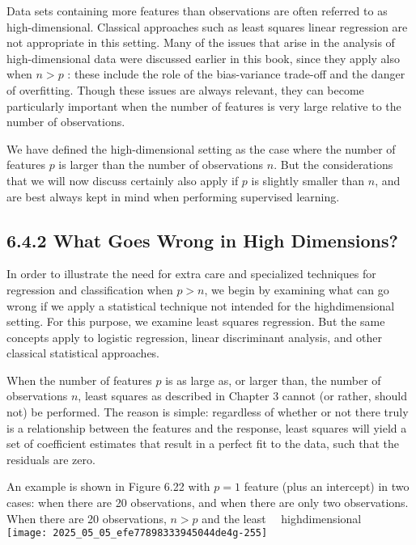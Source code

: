 \documentclass[10pt]{article}
\begin{document}
Data sets containing more features than observations are often referred to as high-dimensional. Classical approaches such as least squares linear regression are not appropriate in this setting. Many of the issues that arise in the analysis of high-dimensional data were discussed earlier in this book, since they apply also when $n>p$ : these include the role of the bias-variance trade-off and the danger of overfitting. Though these issues are always relevant, they can become particularly important when the number of features is very large relative to the number of observations.

We have defined the high-dimensional setting as the case where the number of features $p$ is larger than the number of observations $n$. But the considerations that we will now discuss certainly also apply if $p$ is slightly smaller than $n$, and are best always kept in mind when performing supervised learning.

\subsection*{6.4.2 What Goes Wrong in High Dimensions?}
In order to illustrate the need for extra care and specialized techniques for regression and classification when $p>n$, we begin by examining what can go wrong if we apply a statistical technique not intended for the highdimensional setting. For this purpose, we examine least squares regression. But the same concepts apply to logistic regression, linear discriminant analysis, and other classical statistical approaches.

When the number of features $p$ is as large as, or larger than, the number of observations $n$, least squares as described in Chapter 3 cannot (or rather, should not) be performed. The reason is simple: regardless of whether or not there truly is a relationship between the features and the response, least squares will yield a set of coefficient estimates that result in a perfect fit to the data, such that the residuals are zero.

An example is shown in Figure 6.22 with $p=1$ feature (plus an intercept) in two cases: when there are 20 observations, and when there are only two observations. When there are 20 observations, $n>p$ and the least\
\
highdimensional\\
\texttt{[image: 2025\_05\_05\_efe77898333945044de4g-255]}
\end{document}
